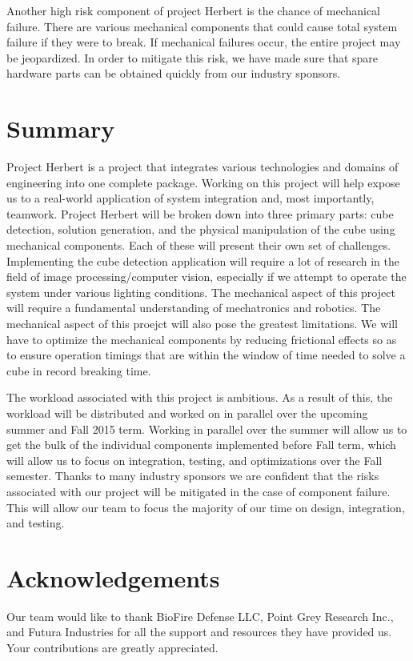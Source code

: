 \documentclass[11pt,english]{article}
\begin{document}
Another high risk component of project Herbert is the chance of mechanical failure. There are various mechanical components that could cause total system failure if they were to break. If mechanical failures occur, the entire project may be jeopardized. In order to mitigate this risk, we have made sure that spare hardware parts can be obtained quickly from our industry sponsors.

\section{Summary}
Project Herbert is a project that integrates various technologies and domains of engineering into one complete package. Working on this project will help expose us to a real-world application of system integration and, most importantly, teamwork. Project Herbert will be broken down into three primary parts: cube detection, solution generation, and the physical manipulation of the cube using mechanical components. Each of these
will present their own set of challenges. Implementing the cube detection application will require a lot of research in the field of image processing/computer vision, especially if we attempt to operate the system under various lighting conditions. The mechanical
aspect of this project will require a fundamental understanding of mechatronics and robotics. The mechanical aspect of this proejct will also pose the greatest limitations. We will have to optimize the mechanical components by reducing frictional effects so as to ensure operation timings that are
within the window of time needed to solve a cube in record breaking time.

The workload associated with this project is ambitious. As a result of this, the workload will be distributed and worked on in parallel over the upcoming summer
and Fall 2015 term. Working in parallel over the summer will allow us to get the bulk of the individual components implemented before Fall term, which will allow us to focus on integration, testing, and
optimizations over the Fall semester. Thanks to many industry sponsors we are confident that the risks associated with our project will be mitigated in the case of component failure. This will allow
our team to focus the majority of our time on design, integration, and testing.

\section{Acknowledgements}
Our team would like to thank BioFire Defense LLC, Point Grey Research Inc., and Futura Industries for all the support and resources they have provided us. Your contributions are greatly appreciated.
\end{document}
